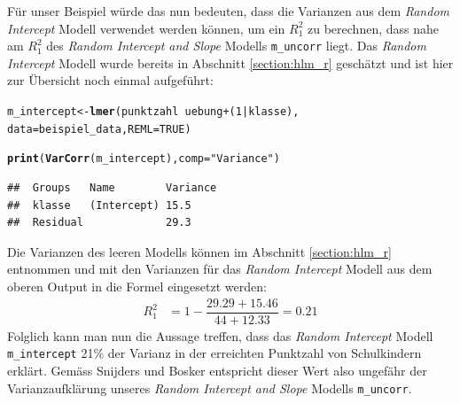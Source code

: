 \documentclass[12pt]{article}\usepackage[]{graphicx}\usepackage[]{color}
\makeatletter
\newcommand{\hlnum}[1]{\textcolor[rgb]{0.686,0.059,0.569}{#1}}%
\newcommand{\hlstr}[1]{\textcolor[rgb]{0.192,0.494,0.8}{#1}}%
\newcommand{\hlopt}[1]{\textcolor[rgb]{0,0,0}{#1}}%
\newcommand{\hlstd}[1]{\textcolor[rgb]{0.345,0.345,0.345}{#1}}%
\newcommand{\hlkwb}[1]{\textcolor[rgb]{0.69,0.353,0.396}{#1}}%
\newcommand{\hlkwc}[1]{\textcolor[rgb]{0.333,0.667,0.333}{#1}}%
\newcommand{\hlkwd}[1]{\textcolor[rgb]{0.737,0.353,0.396}{\textbf{#1}}}%
\newenvironment{kframe}{%
 \def\at@end@of@kframe{}%
 \ifinner\ifhmode%
  \def\at@end@of@kframe{\end{minipage}}%
  \begin{minipage}{\columnwidth}%
 \fi\fi%
 \def\FrameCommand##1{\hskip\@totalleftmargin \hskip-\fboxsep
 \colorbox{shadecolor}{##1}\hskip-\fboxsep
     \hskip-\linewidth \hskip-\@totalleftmargin \hskip\columnwidth}%
 \MakeFramed {\advance\hsize-\width
   \@totalleftmargin\z@ \linewidth\hsize
   \@setminipage}}%
 {\par\unskip\endMakeFramed%
 \at@end@of@kframe}
\newenvironment{knitrout}{}{} %
\makeatother
\begin{document}
Für unser Beispiel würde das nun bedeuten, dass die Varianzen aus dem \textit{Random Intercept} Modell verwendet werden können, um ein $R_{1}^2$ zu berechnen, dass nahe am $R_{1}^2$ des \textit{Random Intercept and Slope} Modells \texttt{m\_uncorr} liegt. Das \textit{Random Intercept} Modell wurde bereits in Abschnitt \ref{section:hlm_r} geschätzt und ist hier zur Übersicht noch einmal aufgeführt:

\singlespacing
\begin{knitrout}
\color{fgcolor}\begin{kframe}
\begin{alltt}
\hlstd{m_intercept} \hlkwb{<-} \hlkwd{lmer}\hlstd{(punktzahl} \hlopt{~} \hlstd{uebung} \hlopt{+} \hlstd{(}\hlnum{1} \hlopt{|} \hlstd{klasse),}
                \hlkwc{data} \hlstd{= beispiel_data,} \hlkwc{REML} \hlstd{=} \hlnum{TRUE}\hlstd{)}

\hlkwd{print}\hlstd{(}\hlkwd{VarCorr}\hlstd{(m_intercept),} \hlkwc{comp} \hlstd{=} \hlstr{"Variance"}\hlstd{)}
\end{alltt}
\begin{verbatim}
##  Groups   Name        Variance
##  klasse   (Intercept) 15.5    
##  Residual             29.3
\end{verbatim}
\end{kframe}
\end{knitrout}




Die Varianzen des leeren Modells können im Abschnitt \ref{section:hlm_r} entnommen und mit den Varianzen für das \textit{Random Intercept} Modell aus dem oberen Output in die Formel eingesetzt werden:
\begin{equation} 
\begin{split}	
 R_{1}^2 & = 1 - \dfrac{29.29 + 15.46}{44 + 12.33} = 0.21
\end{split}	
\end{equation}
Folglich kann man nun die Aussage treffen, dass das \textit{Random Intercept} Modell \texttt{m\_intercept} 21\% der Varianz in der erreichten Punktzahl von Schulkindern erklärt. Gemäss Snijders und Bosker \citeyearpar{SnijdersTomA.B2012Ma:a} entspricht dieser Wert also ungefähr der Varianzaufklärung unseres \textit{Random Intercept and Slope} Modells \texttt{m\_uncorr}. 
\end{document}
